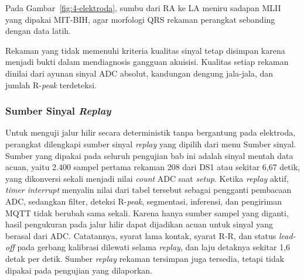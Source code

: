 Pada Gambar~\ref{fig:4-elektroda}, sumbu dari RA ke LA meniru sadapan MLII yang dipakai MIT-BIH, agar morfologi QRS rekaman perangkat sebanding dengan data latih.

Rekaman yang tidak memenuhi kriteria kualitas sinyal tetap disimpan karena menjadi bukti dalam mendiagnosis gangguan akuisisi. Kualitas setiap rekaman dinilai dari ayunan sinyal ADC absolut, kandungan dengung jala-jala, dan jumlah R-\textit{peak} terdeteksi.

\subsubsection{Sumber Sinyal \textit{Replay}}

Untuk menguji jalur hilir secara deterministik tanpa bergantung pada elektroda, perangkat dilengkapi sumber sinyal \textit{replay} yang dipilih dari menu Sumber sinyal. Sumber yang dipakai pada seluruh pengujian bab ini adalah sinyal mentah data acuan, yaitu 2.400 sampel pertama rekaman 208 dari DS1 atau sekitar 6,67 detik, yang dikonversi sekali menjadi nilai \textit{count} ADC saat \textit{setup}. Ketika \textit{replay} aktif, \textit{timer interrupt} menyalin nilai dari tabel tersebut sebagai pengganti pembacaan ADC, sedangkan filter, deteksi R-\textit{peak}, segmentasi, inferensi, dan pengiriman MQTT tidak berubah sama sekali. Karena hanya sumber sampel yang diganti, hasil pengukuran pada jalur hilir dapat dijadikan acuan untuk sinyal yang berasal dari ADC. Catatannya, syarat lama kontak, syarat R-R, dan status \textit{lead-off} pada gerbang kalibrasi dilewati selama \textit{replay}, dan laju detaknya sekitar 1,6 detak per detik. Sumber \textit{replay} rekaman tersimpan juga tersedia, tetapi tidak dipakai pada pengujian yang dilaporkan.

